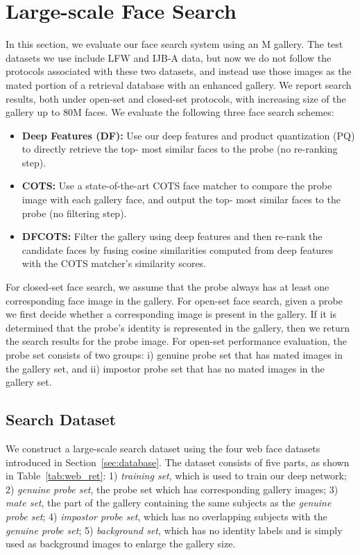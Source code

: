 \documentclass[10pt,journal,compsoc]{IEEEtran}
\begin{document}
\section{Large-scale Face Search}
In this section, we evaluate our face search system using an M gallery. The test datasets we use include LFW and IJB-A data, but now we do not follow the protocols associated with these two datasets, and instead use those images as the mated portion of a retrieval database with an enhanced gallery. We report search results, both under open-set and closed-set protocols, with increasing size of the gallery up to 80M faces. We evaluate the following three face search schemes:
\begin{itemize}
  \item {\bf Deep Features (DF):} Use our deep features and product quantization (PQ) to directly retrieve the top- most similar faces to the probe (no re-ranking step).
  \item {\bf COTS:} Use a state-of-the-art COTS face matcher to compare the probe image with each gallery face, and output the top- most similar faces to the probe (no filtering step).\item {\bf DFCOTS:} Filter the gallery using deep features and then re-rank the  candidate faces by fusing cosine similarities computed from deep features with the COTS matcher's similarity scores.
\end{itemize}

For closed-set face search, we assume that the probe always has at least one corresponding face image in the gallery. For open-set face search, given a probe we first decide whether a corresponding image is present in the gallery. If it is determined that the probe's identity is represented in the gallery, then we return the search results for the probe image. For open-set performance evaluation, the probe set consists of two groups: i) genuine probe set that has mated images in the gallery set, and ii) impostor probe set that has no mated images in the gallery set.

\subsection{Search Dataset}
We construct a large-scale search dataset using the four web face datasets introduced in Section~\ref{sec:database}. The dataset consists of five parts, as shown in Table~\ref{tab:web_ret}: 1) \emph{training set}, which is used to train our deep network; 2) \emph{genuine probe set}, the probe set which has corresponding gallery images; 3) \emph{mate set}, the part of the gallery containing the same subjects as the \emph{genuine probe set}; 4) \emph{impostor probe set}, which has no overlapping subjects with the \emph{genuine probe set}; 5) \emph{background set}, which has no identity labels and is simply used as background images to enlarge the gallery size.
\end{document}
